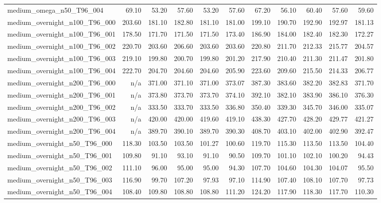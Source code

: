\begin{table}[htbp]
\begin{tabular}{lrrrrrrrrrr}
medium\_omega\_n50\_T96\_004 & 69.10 & 53.20 & 57.60 & 53.20 & 57.60 & 67.20 & 56.10 & 60.40 & 57.60 & 59.60 \\
medium\_overnight\_n100\_T96\_000 & 203.60 & 181.10 & 182.80 & 181.10 & 181.00 & 199.10 & 190.70 & 192.90 & 192.97 & 181.13 \\
medium\_overnight\_n100\_T96\_001 & 178.50 & 171.70 & 171.50 & 171.50 & 173.40 & 186.90 & 184.00 & 182.40 & 182.30 & 172.27 \\
medium\_overnight\_n100\_T96\_002 & 220.70 & 203.60 & 206.60 & 203.60 & 203.60 & 220.80 & 211.70 & 212.33 & 215.77 & 204.57 \\
medium\_overnight\_n100\_T96\_003 & 219.10 & 199.80 & 200.70 & 199.80 & 201.20 & 217.90 & 210.40 & 211.30 & 211.47 & 201.80 \\
medium\_overnight\_n100\_T96\_004 & 222.70 & 204.70 & 204.60 & 204.60 & 205.90 & 223.60 & 209.60 & 215.50 & 214.33 & 206.77 \\
medium\_overnight\_n200\_T96\_000 & n/a & 371.00 & 371.10 & 371.00 & 373.07 & 387.30 & 383.60 & 382.20 & 382.83 & 371.70 \\
medium\_overnight\_n200\_T96\_001 & n/a & 373.80 & 373.70 & 373.70 & 374.10 & 392.10 & 382.10 & 383.90 & 386.10 & 376.30 \\
medium\_overnight\_n200\_T96\_002 & n/a & 333.50 & 333.70 & 333.50 & 336.80 & 350.40 & 339.30 & 345.70 & 346.00 & 335.07 \\
medium\_overnight\_n200\_T96\_003 & n/a & 420.00 & 420.00 & 419.60 & 419.10 & 438.30 & 427.70 & 428.20 & 429.77 & 421.27 \\
medium\_overnight\_n200\_T96\_004 & n/a & 389.70 & 390.10 & 389.70 & 390.30 & 408.70 & 403.10 & 402.00 & 402.90 & 392.47 \\
medium\_overnight\_n50\_T96\_000 & 118.30 & 103.50 & 103.50 & 101.27 & 100.60 & 119.70 & 115.30 & 113.50 & 113.50 & 104.40 \\
medium\_overnight\_n50\_T96\_001 & 109.80 & 91.10 & 93.10 & 91.10 & 90.50 & 109.70 & 101.10 & 102.10 & 100.20 & 94.43 \\
medium\_overnight\_n50\_T96\_002 & 111.10 & 96.00 & 95.00 & 95.00 & 94.30 & 107.70 & 104.60 & 104.30 & 104.07 & 95.50 \\
medium\_overnight\_n50\_T96\_003 & 116.90 & 99.70 & 107.20 & 97.93 & 97.10 & 114.90 & 107.40 & 108.10 & 107.70 & 97.73 \\
medium\_overnight\_n50\_T96\_004 & 108.40 & 109.80 & 108.80 & 108.80 & 111.20 & 124.20 & 117.90 & 118.30 & 117.70 & 110.30 \\

\end{tabular}
\end{table}
